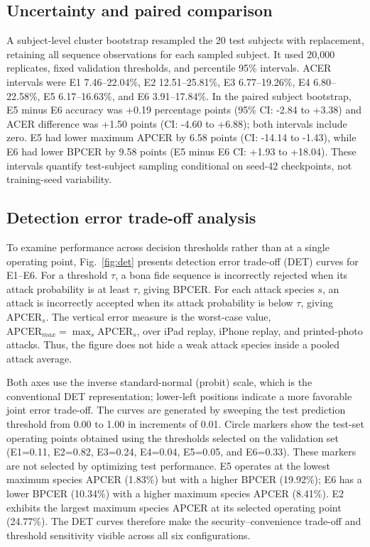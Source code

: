 \documentclass[a4paper,conference]{IEEEtran}
\begin{document}
\subsection{Uncertainty and paired comparison}
A subject-level cluster bootstrap resampled the 20 test subjects with replacement, retaining all sequence observations for each sampled subject. It used 20,000 replicates, fixed validation thresholds, and percentile 95\% intervals. ACER intervals were E1 7.46--22.04\%, E2 12.51--25.81\%, E3 6.77--19.26\%, E4 6.80--22.58\%, E5 6.17--16.63\%, and E6 3.91--17.84\%. In the paired subject bootstrap, E5 minus E6 accuracy was +0.19 percentage points (95\% CI: -2.84 to +3.38) and ACER difference was +1.50 points (CI: -4.60 to +6.88); both intervals include zero. E5 had lower maximum APCER by 6.58 points (CI: -14.14 to -1.43), while E6 had lower BPCER by 9.58 points (E5 minus E6 CI: +1.93 to +18.04). These intervals quantify test-subject sampling conditional on seed-42 checkpoints, not training-seed variability.


\subsection{Detection error trade-off analysis}
To examine performance across decision thresholds rather than at a single operating point, Fig.~\ref{fig:det} presents detection error trade-off (DET) curves for E1--E6. For a threshold $\tau$, a bona fide sequence is incorrectly rejected when its attack probability is at least $\tau$, giving BPCER. For each attack species $s$, an attack is incorrectly accepted when its attack probability is below $\tau$, giving $\mathrm{APCER}_s$. The vertical error measure is the worst-case value, $\mathrm{APCER}_{max}=\max_s\mathrm{APCER}_s$, over iPad replay, iPhone replay, and printed-photo attacks. Thus, the figure does not hide a weak attack species inside a pooled attack average.

Both axes use the inverse standard-normal (probit) scale, which is the conventional DET representation; lower-left positions indicate a more favorable joint error trade-off. The curves are generated by sweeping the test prediction threshold from 0.00 to 1.00 in increments of 0.01. Circle markers show the test-set operating points obtained using the thresholds selected on the validation set (E1=0.11, E2=0.82, E3=0.24, E4=0.04, E5=0.05, and E6=0.33). These markers are not selected by optimizing test performance. E5 operates at the lowest maximum species APCER (1.83\%) but with a higher BPCER (19.92\%); E6 has a lower BPCER (10.34\%) with a higher maximum species APCER (8.41\%). E2 exhibits the largest maximum species APCER at its selected operating point (24.77\%). The DET curves therefore make the security--convenience trade-off and threshold sensitivity visible across all six configurations.
\end{document}

